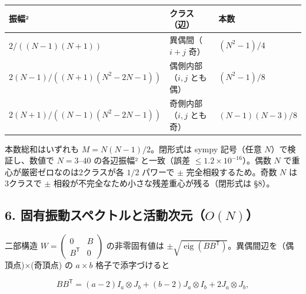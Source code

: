 \documentclass[
  a4paper,
]{ltjsarticle}
\newcounter{none} %
\begin{document}
{\def\LTcaptype{none} %
\begin{longtable}[]{@{}
  >{\raggedright\arraybackslash}p{}
  >{\raggedright\arraybackslash}p{}
  >{\raggedright\arraybackslash}p{}@{}}
\toprule\noalign{}
\begin{minipage}[b]{\linewidth}\raggedright
振幅²
\end{minipage} & \begin{minipage}[b]{\linewidth}\raggedright
クラス（辺）
\end{minipage} & \begin{minipage}[b]{\linewidth}\raggedright
本数
\end{minipage} \\
\midrule\noalign{}
\endhead
\bottomrule\noalign{}
\endlastfoot
\(2/((N-1)(N+1))\) & 異偶間（\(i+j\) 奇） & \((N^2-1)/4\) \\
\(2(N-1)/((N+1)(N^2-2N-1))\) & 偶側内部（\(i,j\) とも偶） &
\((N^2-1)/8\) \\
\(2(N+1)/((N-1)(N^2-2N-1))\) & 奇側内部（\(i,j\) とも奇） &
\((N-1)(N-3)/8\) \\
\end{longtable}
}

本数総和はいずれも \(M=N(N-1)/2\)。閉形式は sympy 記号（任意
\(N\)）で検証し、数値で \(N=3\)--\(40\) の各辺振幅² と一致（誤差
\(\le1.2\times10^{-16}\)）。偶数 \(N\) で重心が厳密ゼロなのは2クラスが各
\(1/2\) パワーで \(\pm\) 完全相殺するため。奇数 \(N\) は3クラスで
\(\pm\) 相殺が不完全なため小さな残差重心が残る（閉形式は §8）。

\subsection{\texorpdfstring{6.
固有振動スペクトルと活動次元（\(O(N)\)）}{6. 固有振動スペクトルと活動次元（O(N)）}}\label{ux56faux6709ux632fux52d5ux30b9ux30daux30afux30c8ux30ebux3068ux6d3bux52d5ux6b21ux5143on}

二部構造 \(W=\begin{pmatrix}0&B\\B^{\mathsf T}&0\end{pmatrix}\)
の非零固有値は
\(\pm\sqrt{\operatorname{eig}(BB^{\mathsf T})}\)。異偶間辺を（偶頂点)×(奇頂点)
の \(a\times b\) 格子で添字づけると

\[BB^{\mathsf T}=(a-2)I_a\otimes J_b+(b-2)J_a\otimes I_b+2J_a\otimes J_b,\]
\end{document}
